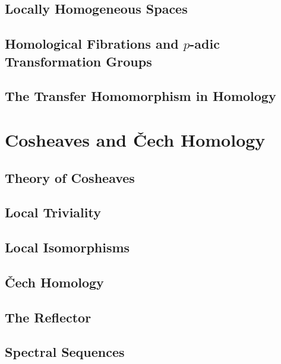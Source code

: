 \documentclass[11pt, a4paper]{article}
\begin{document}
\subsection{Locally Homogeneous Spaces}

\subsection{Homological Fibrations and $p$-adic Transformation Groups}

\subsection{The Transfer Homomorphism in Homology}

\section{Cosheaves and \v{C}ech Homology}

\subsection{Theory of Cosheaves}

\subsection{Local Triviality}

\subsection{Local Isomorphisms}

\subsection{\v{C}ech Homology}

\subsection{The Reflector}

\subsection{Spectral Sequences}

\end{document}

